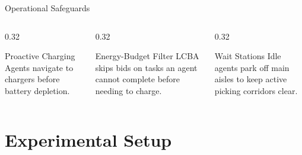 \documentclass[aspectratio=169, 11pt]{beamer}
\newcommand{\smallcap}[1]{{\rmfamily\small\color{TextSecondary} #1}}
\begin{document}
\begin{frame}{Operational Safeguards}
  \begin{columns}[T]
    \begin{column}{0.32\textwidth}
      \begin{plaincard}{Proactive Charging}
        \smallcap{Agents navigate to chargers before battery
                  depletion.}
      \end{plaincard}
    \end{column}
    \begin{column}{0.32\textwidth}
      \begin{plaincard}{Energy-Budget Filter}
        \smallcap{LCBA skips bids on tasks an agent cannot complete
                  before needing to charge.}
      \end{plaincard}
    \end{column}
    \begin{column}{0.32\textwidth}
      \begin{plaincard}{Wait Stations}
        \smallcap{Idle agents park off main aisles to keep active
                  picking corridors clear.}
      \end{plaincard}
    \end{column}
  \end{columns}
\end{frame}

\section{Experimental Setup}
\end{document}
